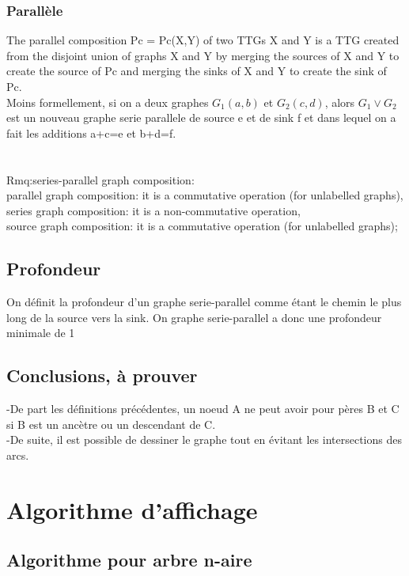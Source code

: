 \documentclass[11pt]{report}
\begin{document}
\subsubsection{Parallèle}
The parallel composition Pc = Pc(X,Y) of two TTGs X and Y is a TTG created from the disjoint union of graphs X and Y by merging the sources of X and Y to create the source of Pc and merging the sinks of X and Y to create the sink of Pc.\\
Moins formellement, si on a deux graphes $G_1(a,b)$ et $G_2(c,d)$, alors $G_1 \vee G_2$ est un nouveau graphe serie parallele de source e et de sink f et dans lequel on a fait les additions a+c=e et b+d=f.\\
\\
\\
Rmq:series-parallel graph composition:\\
parallel graph composition: it is a commutative operation (for unlabelled graphs),\\
series graph composition: it is a non-commutative operation,\\
source graph composition: it is a commutative operation (for unlabelled graphs);\\
\subsection{Profondeur}
On définit la profondeur d'un graphe serie-parallel comme étant le chemin le plus long de la source vers la sink. On graphe serie-parallel a donc une profondeur minimale de 1
\subsection{Conclusions, à prouver}
-De part les définitions précédentes, un noeud A ne peut avoir pour pères B et C si B est un ancètre ou un descendant de C.\\
-De suite, il est possible de dessiner le graphe tout en évitant les intersections des arcs.\\

\section{Algorithme d'affichage}
\subsection{Algorithme pour arbre n-aire}
\end{document}
